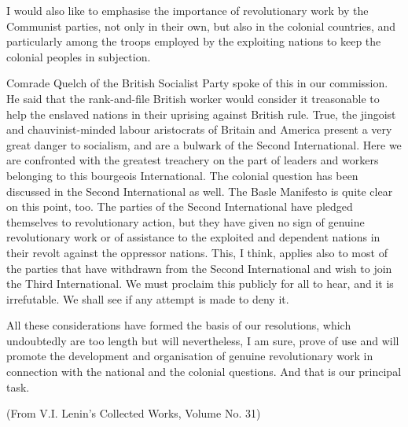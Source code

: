 I would also like to emphasise the importance of revolutionary work by the Communist parties, not only in their own, but also in the colonial countries, and particularly among the troops employed by the exploiting nations to keep the colonial peoples in subjection. 

Comrade Quelch of the British Socialist Party spoke of this in our commission. He said that the rank-and-file British worker would consider it treasonable to help the enslaved nations in their uprising against British rule. True, the jingoist and chauvinist-minded labour aristocrats of Britain and America present a very great danger to socialism, and are a bulwark of the Second International. Here we are confronted with 
the greatest treachery on the part of leaders and workers belonging to this bourgeois International. The colonial question has been discussed in the Second International as well. The Basle Manifesto is quite clear on this point, too. The parties of the Second International have pledged themselves to revolutionary action, but they have given no sign of genuine revolutionary work or of assistance to the exploited and dependent nations in their revolt against the oppressor nations. This, I think, applies also to most of the parties that have withdrawn from the Second International and wish to join the Third International. We must proclaim this publicly for all to hear, and it is irrefutable. We shall see if any attempt is made to deny it. 

All these considerations have formed the basis of our resolutions, which undoubtedly are too length but will nevertheless, I am sure, prove of use and will promote the development and organisation of genuine revolutionary work in connection with the national and the colonial questions. And that is our principal task. 

(From V.I. Lenin’s Collected Works, Volume No. 31) 

